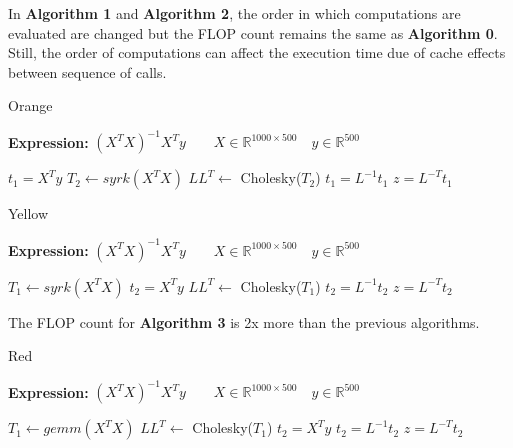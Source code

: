 \documentclass[conference]{IEEEtran}
\begin{document}
In \textbf{Algorithm 1} and \textbf{Algorithm 2}, the order in which computations are evaluated are changed but the FLOP count remains the same as \textbf{Algorithm 0}. Still, the order of computations can affect the execution time due of cache effects between sequence of calls\cite{peise2014cache}.
\begin{algorithm}
	\renewcommand{\thealgorithm}{}
	\caption{ Orange }
	\label{alg:a0}
	\textbf{Expression: } $(X^TX)^{-1}X^{T}y \qquad X \in \mathbb{R}^{1000 \times 500} \quad y \in \mathbb{R}^{500}$ 
	\begin{algorithmic}[1] 
		\State $t_1 = X^{T}y$ 
		\State $T_2 \leftarrow syrk(X^{T}X)$ 
		\State $LL^{T} \leftarrow $ Cholesky($T_2$) 
		\State $t_1 = L^{-1}t_1$ 
		\State $z = L^{-T}t_1$
	\end{algorithmic}
\end{algorithm}

\begin{algorithm}
	\renewcommand{\thealgorithm}{}
	\caption{ Yellow }
	\label{alg:a0}
	\textbf{Expression: } $(X^TX)^{-1}X^{T}y \qquad X \in \mathbb{R}^{1000 \times 500} \quad y \in \mathbb{R}^{500}$ 
	\begin{algorithmic}[1] 
		\State $T_1 \leftarrow syrk(X^{T}X)$ 
		\State $t_2 = X^{T}y$ 
		\State $LL^{T} \leftarrow $ Cholesky($T_1$) 
		\State $t_2 = L^{-1}t_2$ 
		\State $z = L^{-T}t_2$
	\end{algorithmic}
\end{algorithm}

The FLOP count for \textbf{Algorithm 3} is 2x more than the previous algorithms.
\begin{algorithm}
	\renewcommand{\thealgorithm}{}
	\caption{ Red }
	\label{alg:a0}
	\textbf{Expression: } $(X^TX)^{-1}X^{T}y \qquad X \in \mathbb{R}^{1000 \times 500} \quad y \in \mathbb{R}^{500}$ 
	\begin{algorithmic}[1] 
		\State $T_1 \leftarrow gemm(X^{T}X)$ 
		\State $LL^{T} \leftarrow $ Cholesky($T_1$) 
		\State $t_2 = X^{T}y$ 
		\State $t_2 = L^{-1}t_2$ 
		\State $z = L^{-T}t_2$
	\end{algorithmic}

\end{algorithm}
\end{document}
